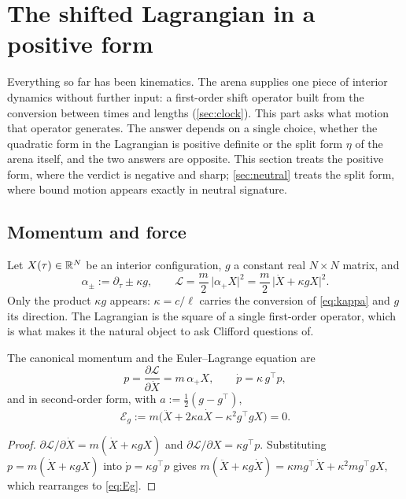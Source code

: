 \section{The shifted Lagrangian in a positive form}
\label{sec:shifted}

Everything so far has been kinematics. The arena supplies one piece of interior dynamics without further input: a first-order shift
operator built from the conversion between times and lengths (\cref{sec:clock}). This part asks what motion that operator
generates. The answer depends on a single choice, whether the quadratic form in the Lagrangian is positive definite or the split form
$\eta$ of the arena itself, and the two answers are opposite. This section treats the positive form, where the verdict is negative and
sharp; \cref{sec:neutral} treats the split form, where bound motion appears exactly in neutral signature.

\subsection{Momentum and force}

Let $X(\tau)\in\mathbb{R}^N$ be an interior configuration, $g$ a constant real $N\times N$ matrix, and
\begin{equation}
\label{eq:alpha}
\alpha_\pm:=\partial_\tau\pm\kappa g,\qquad \mathcal L=\frac m2\,\bigl|\alpha_+X\bigr|^2=\frac m2\,\bigl|\dot X+\kappa gX\bigr|^2 .
\end{equation}
Only the product $\kappa g$ appears: $\kappa=c/\ell$ carries the conversion of \eqref{eq:kappa} and $g$ its direction. The Lagrangian is the
square of a single first-order operator, which is what makes it the natural object to ask Clifford questions of.

\begin{proposition}
\label{prop:force}
The canonical momentum and the Euler--Lagrange equation are
\begin{equation}
\label{eq:pdot}
p=\frac{\partial\mathcal L}{\partial\dot X}=m\,\alpha_+X,\qquad \dot p=\kappa\,g^{\!\top}p ,
\end{equation}
and in second-order form, with $a:=\tfrac12(g-g^{\!\top})$,
\begin{equation}
\label{eq:Eg}
\mathcal E_g:=m\bigl(\ddot X+2\kappa a\dot X-\kappa^2g^{\!\top}gX\bigr)=0 .
\end{equation}
\end{proposition}

\begin{proof}
$\partial\mathcal L/\partial\dot X=m(\dot X+\kappa gX)$ and $\partial\mathcal L/\partial X=\kappa g^{\!\top}p$. Substituting $p=m(\dot X+\kappa gX)$ into
$\dot p=\kappa g^{\!\top}p$ gives $m(\ddot X+\kappa g\dot X)=\kappa mg^{\!\top}\dot X+\kappa^2mg^{\!\top}gX$, which rearranges to \eqref{eq:Eg}.
\end{proof}

